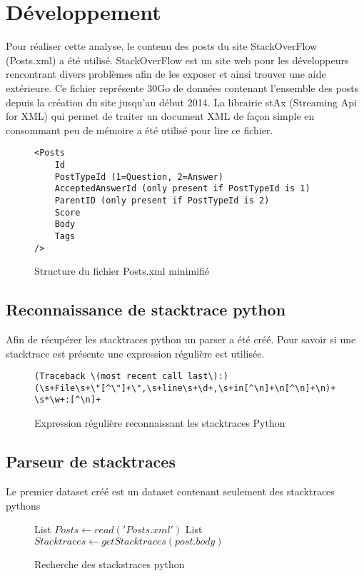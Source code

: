 \section{Développement}
Pour réaliser cette analyse, le contenu des posts du site StackOverFlow (Posts.xml) a été utilisé. StackOverFlow est un site web pour les développeurs rencontrant divers problèmes afin de les exposer et ainsi trouver une aide extérieure. Ce fichier représente 30Go de données contenant l'ensemble des posts depuis la création du site jusqu'au début 2014.
La librairie stAx (Streaming Api for XML) qui permet de traiter un document XML de façon simple en consommant peu de mémoire a été utilisé pour lire ce fichier.
\begin{figure}
\begin{lstlisting}
<Posts
	Id
	PostTypeId (1=Question, 2=Answer)
	AcceptedAnswerId (only present if PostTypeId is 1)
	ParentID (only present if PostTypeId is 2)
	Score
	Body
	Tags
/>
\end{lstlisting}
\caption{Structure du fichier Posts.xml minimifié}
\label{code:posts}
\end{figure}

\subsection{Reconnaissance de stacktrace python}
Afin de récupérer les stacktraces python un parser a été créé. Pour savoir si une stacktrace est présente une expression régulière est utilisée.
\begin{figure}
\begin{lstlisting}
(Traceback \(most recent call last\):)
(\s+File\s+\"[^\"]+\",\s+line\s+\d+,\s+in[^\n]+\n[^\n]+\n)+
\s*\w+:[^\n]+
\end{lstlisting}
\caption{Expression régulière reconnaissant les stacktraces Python}
\label{code:regex}
\end{figure}

\subsection{Parseur de stacktraces}
Le premier dataset créé est un dataset contenant seulement  des stacktraces pythons
\begin{figure}[!h]
\begin{center}
\begin{algorithmic}
	\State List $Posts \gets read('Posts.xml')$
		\State List $Stacktraces \gets getStacktraces(post.body)$
		\EndFor
	\EndFor
\EndFunction
\end{algorithmic}
\caption{Recherche des stackstraces python}
\label{Recherche des stackstraces python}
\end{center}
\end{figure}

